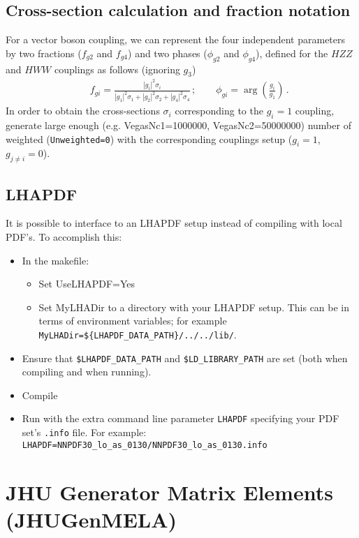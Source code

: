 \documentclass[aps,superscriptaddress,nofootinbib]{revtex4}
\begin{document}
\subsection{Cross-section calculation and fraction notation}

For a vector boson coupling, we can represent the four independent parameters by two  fractions
($f_{g2}$ and $f_{g4}$) and two phases ($\phi_{g2}$ and $\phi_{g4}$), defined for the $HZZ$
and $HWW$ couplings as follows (ignoring $g_3$)
%
\begin{eqnarray}
&& f_{gi} =  \frac{|g^{}_{i}|^2\sigma_i}{|g^{}_{1}|^2\sigma_1+|g^{}_{2}|^2\sigma_2+|g^{}_{4}|^2\sigma_4}\,;
~~~~~~~~~
 \phi_{gi} = \arg\left(\frac{g_i}{g_1}\right)\,.
\nonumber
\label{eq:fractions}
\end{eqnarray}
%
In order to obtain the cross-sections $\sigma_i$ corresponding to the $g^{}_{i}=1$ coupling,
generate large enough (e.g. VegasNc1=1000000, VegasNc2=50000000) number of weighted
({\tt Unweighted=0}) with the corresponding couplings setup ($g^{}_{i}=1$, $g^{}_{j\ne i}=0$).

\subsection{LHAPDF}

It is possible to interface to an LHAPDF setup instead of compiling with local PDF's.  To accomplish this:

\begin{itemize}
\item In the makefile:
\begin{itemize}
\item Set UseLHAPDF=Yes
\item Set MyLHADir to a directory with your LHAPDF setup.  This can be in terms of environment variables; for example \verb|MyLHADir=${LHAPDF_DATA_PATH}/../../lib/|.
\end{itemize}
\item Ensure that \verb|$LHAPDF_DATA_PATH| and \verb|$LD_LIBRARY_PATH| are set (both when compiling and when running).
\item Compile
\item Run with the extra command line parameter \verb|LHAPDF| specifying your PDF set's \verb|.info| file.  For example: \verb|LHAPDF=NNPDF30_lo_as_0130/NNPDF30_lo_as_0130.info|
\end{itemize}


\section{ JHU Generator Matrix Elements (JHUGenMELA)}
\end{document}
